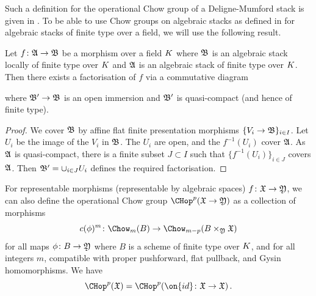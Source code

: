 
Such a definition for the operational Chow group of a Deligne-Mumford stack is given in \cite{Edidin2017Towards-an-inter}. To be able to use Chow groups on algebraic stacks as defined in \cite{Kresch1999Cycle-groups-fo} for algebraic stacks of finite type over a field, we will use the following result.
\begin{lemma}
\notready\label{lem:factorisationopenquasi}
Let $f\colon \frak A \to \frak B$ be a morphism over a field ${K}$ where $\frak B$ is an algebraic stack
locally of finite type over ${K}$ and $\frak A$ is an algebraic stack of finite type over ${K}$. Then there exists a factorisation of $f$ via a commutative diagram


where $\frak B' \to \frak B$ is an open immersion and $\frak B'$ is quasi-compact (and hence of finite type).
\end{lemma}

\begin{proof}
We cover $\frak B$ by affine flat finite presentation morphisms $\{V_i \to \frak B\}_{i \in I}$.
Let $U_i$ be the image of the $V_i$ in $\frak B$. The $U_i$ are open, and the $f^{-1}(U_i)$ cover $\frak A$. As $\frak A$ is quasi-compact, there is a finite subset $J \subset I$ such that $\{f^{-1}(U_i)\}_{i \in J}$ covers $\frak A$. Then $\frak B' = \cup_{i \in J} U_i$
defines the required factorisation.
\end{proof}

For representable morphisms (representable by algebraic spaces) $f\colon \frak X \to \frak Y$, we can also define the operational Chow group $\CHop^p(\frak X \to \frak Y)$ as a collection of morphisms
\[c(\phi)^{m}\colon \Chow_{m}(B) \to  \Chow_{m-p}(B \times_{\frak Y} \frak X)\]
for all maps $\phi \colon B \to \frak Y$ where $B$ is a scheme of finite type over ${K}$, and for all integers $m$, compatible with proper pushforward, flat pullback, and Gysin homomorphisms. We have
$$\CHop^p(\frak X) = \CHop^p(\on{id}\colon \frak X \to \frak X)\,. $$

